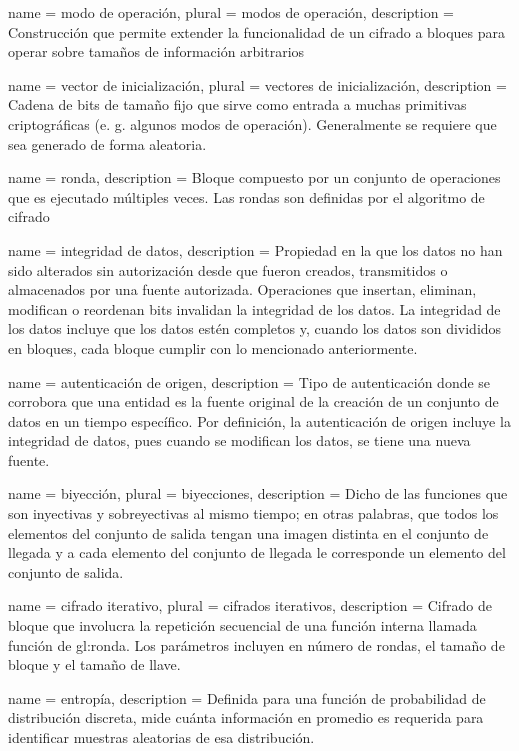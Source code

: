 %
%
%

\makeglossaries

{
  name = modo de operación,
  plural = modos de operación,
  description = {
    Construcción que permite extender la funcionalidad de un cifrado a bloques
    para operar sobre tamaños de información arbitrarios%
  }
}

{
  name = vector de inicialización,
  plural = vectores de inicialización,
  description = {
    Cadena de bits de tamaño fijo que sirve como entrada a muchas primitivas
    criptográficas (e. g. algunos modos de operación). Generalmente se requiere
    que sea generado de forma aleatoria.
  }
}

{
  name = ronda,
  description = {
    Bloque compuesto por un conjunto de operaciones que es ejecutado
    múltiples veces. Las rondas son definidas por el algoritmo de cifrado%
  }
}

{
  name = integridad de datos,
  description = {
    Propiedad en la que los datos no han sido alterados sin autorización desde
    que fueron creados, transmitidos o almacenados por una fuente autorizada.
    Operaciones que insertan, eliminan, modifican o reordenan bits invalidan
    la integridad de los datos. La integridad de los datos incluye que los
    datos estén completos y, cuando los datos son divididos en bloques, cada
    bloque cumplir con lo mencionado anteriormente.
  }
}

{
  name = autenticación de origen,
  description = {
    Tipo de autenticación donde se corrobora que una entidad es la fuente
    original de la creación de un conjunto de datos en un tiempo específico.
    Por definición, la autenticación de origen incluye la integridad de datos,
    pues cuando se modifican los datos, se tiene una nueva fuente.
  }
}

{
  name = biyección,
  plural = biyecciones,
  description = {
    Dicho de las funciones que son inyectivas y sobreyectivas
    al mismo tiempo; en otras palabras, que todos los elementos
    del conjunto de salida tengan una imagen distinta en el conjunto
    de llegada y a cada elemento del conjunto de llegada le corresponde
    un elemento del conjunto de salida.
  }
}

{
  name = cifrado iterativo,
  plural = cifrados iterativos,
  description = {
    Cifrado de bloque que involucra la repetición secuencial de
    una función interna llamada función de \gls{gl:ronda}. Los
    parámetros incluyen en número de rondas, el tamaño de bloque y
    el tamaño de llave.
  }
}

{
  name = entropía,
  description = {
    Definida para una función de probabilidad de distribución discreta, mide cuánta información en promedio es requerida para identificar muestras aleatorias de esa distribución.
  }
}
